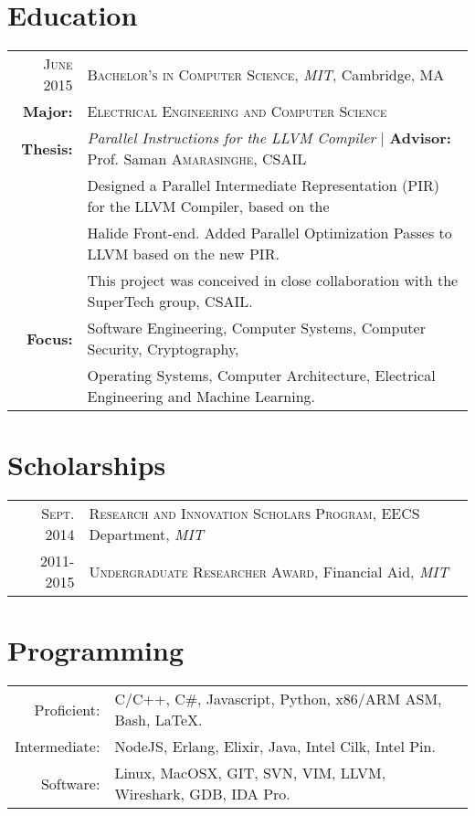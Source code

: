 \documentclass[lettersize,10pt]{article}
\begin{document}
\section{Education}
\begin{tabular}{rl}	
\textsc{June} 2015 & \textsc{Bachelor's in Computer Science}, \emph{MIT}, Cambridge, MA\\
\textbf{Major:} & \textsc{Electrical Engineering and Computer Science}\\
\textbf{Thesis:} & \emph{Parallel Instructions for the LLVM Compiler} | \textbf{Advisor:} Prof. Saman \textsc{Amarasinghe}, CSAIL\\
& Designed a Parallel Intermediate Representation (PIR) for the LLVM Compiler, based on the \\
& Halide Front-end. Added Parallel Optimization Passes to LLVM based on the new PIR. \\
& This project was conceived in close collaboration with the SuperTech group, CSAIL. \\
\textbf{Focus:} &  Software Engineering, Computer Systems, Computer Security, Cryptography, \\
& Operating Systems, Computer Architecture, Electrical Engineering and Machine Learning.\\
\end{tabular}

\section{Scholarships}
\begin{tabular}{rl}
 \textsc{Sept.} 2014 & \textsc{Research and Innovation Scholars Program}, EECS Department, \emph{MIT}\\
2011-2015 & \textsc{Undergraduate Researcher Award}, Financial Aid, \emph{MIT}\\
\end{tabular}

\section{Programming}
\begin{tabular}{rl}
Proficient:& C/C++, C\#, Javascript, Python, x86/ARM ASM, Bash, \LaTeX.\\
Intermediate:& NodeJS, Erlang, Elixir, Java, Intel Cilk, Intel Pin.\\
Software:& Linux, MacOSX, GIT, SVN, VIM, LLVM, Wireshark, GDB, IDA Pro.\\
\end{tabular}
\end{document}
